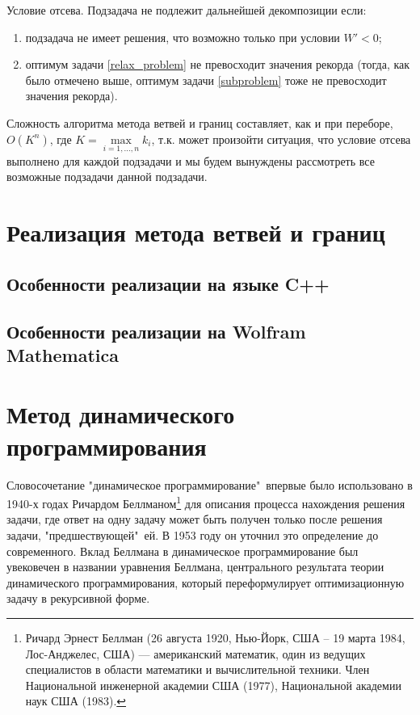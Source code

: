 \documentclass[12pt, a4paper]{article}
\begin{document}
Условие отсева. Подзадача не подлежит дальнейшей декомпозиции если:
\begin{enumerate}
	\item подзадача не имеет решения, что возможно только при условии $W' < 0$;
	\item оптимум задачи \eqref{relax_problem} не превосходит значения рекорда (тогда, как было отмечено выше, оптимум задачи \eqref{subproblem} тоже не превосходит значения рекорда).
\end{enumerate}

Сложность алгоритма метода ветвей и границ составляет, как и при переборе,~$O(K^n)$, где $K = \max\limits_{i=1,\dots,n} k_i$, т.к. может произойти ситуация, что условие отсева выполнено для каждой подзадачи и мы будем вынуждены рассмотреть все возможные подзадачи данной подзадачи.

\section{Реализация метода ветвей и границ}

\subsection{Особенности реализации на языке C++}


\subsection{Особенности реализации на Wolfram Mathematica}


\section{Метод динамического программирования}
Словосочетание "динамическое программирование"\, впервые было использовано в 1940-х годах Ричардом Беллманом\footnote{Ричард Эрнест Беллман (26 августа 1920, Нью-Йорк, США -- 19 марта 1984, Лос-Анджелес, США) --- американский математик, один из ведущих специалистов в области математики и вычислительной техники. Член Национальной инженерной академии США (1977), Национальной академии наук США (1983).} для описания процесса нахождения решения задачи, где ответ на одну задачу может быть получен только после решения задачи, "предшествующей"\, ей. В 1953 году он уточнил это определение до современного. Вклад Беллмана в динамическое программирование был увековечен в названии уравнения Беллмана, центрального результата теории динамического программирования, который переформулирует оптимизационную задачу в рекурсивной форме.
\end{document}
